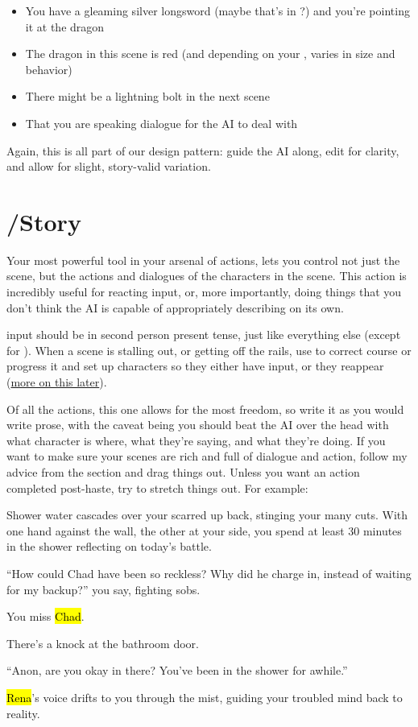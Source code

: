 \documentclass[Avsfag-main.tex]{subfiles}
\begin{document}
\begin{itemize}
\item
  You have a gleaming silver longsword (maybe that's in \wi?) and
  you're pointing it at the dragon
\item
  The dragon in this scene is red (and depending on your \wi,
  varies in size and behavior)
\item
  There might be a lightning bolt in the next scene
\item
  That you are speaking dialogue for the AI to deal with
\end{itemize}

Again, this is all part of our design pattern: guide the AI along, edit for clarity, and allow for slight, story-valid variation.

\section{/Story}
\label{sec:story}

Your most powerful tool in your arsenal of actions, \story lets you control not just the scene, but the actions and dialogues of the characters in the scene.
This action is incredibly useful for reacting input, or, more importantly, doing things that you don't think the AI is capable of appropriately describing on its own.

\story input should be in second person present tense, just like everything else (except for \Do).
When a scene is stalling out, or getting off the rails, use \story to correct course or progress it and set up characters so they either have input, or they reappear
(\hyperref[ch:qa]{more on this later}).

Of all the actions, this one allows for the most freedom, so write it as you would write prose, with the caveat being you should beat the AI over the head with what character is where, what they're saying, and what they're doing.
If you want to make sure your scenes are rich and full of dialogue and action, follow my advice from the \Do section and drag things out.
Unless you want an action completed post-haste, try to stretch things out.
For example:

\begin{storyb}
\story Shower water cascades over your scarred up back, stinging your many cuts.
With one hand against the wall, the other at your side, you spend at least 30 minutes in the shower reflecting on today's battle.

``How could Chad have been so reckless?
Why did he charge in, instead of waiting for my backup?'' you say, fighting sobs.

You miss \hl{Chad}.

There's a knock at the bathroom door.

``Anon, are you okay in there?
You've been in the shower for awhile.''

\hl{Rena}'s voice drifts to you through the mist, guiding your troubled mind back to reality.

\keys{\return}
\end{storyb}
\end{document}
